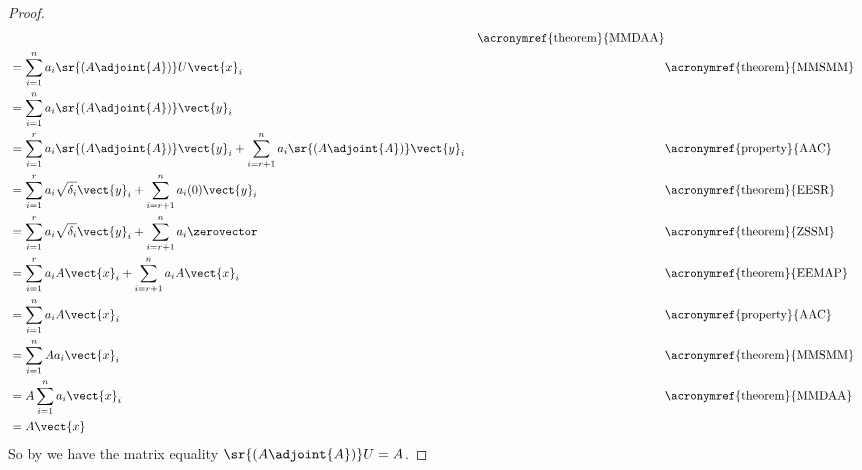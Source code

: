 \begin{proof}
\begin{align*}
&&\text{\acronymref{theorem}{MMDAA}}\\
%
&=\sum_{i=1}^{n}a_i\sr{\left(A\adjoint{A}\right)}U\vect{x}_i
&&\text{\acronymref{theorem}{MMSMM}}\\
%
&=\sum_{i=1}^{n}a_i\sr{\left(A\adjoint{A}\right)}\vect{y}_i\\
%
&=\sum_{i=1}^{r}a_i\sr{\left(A\adjoint{A}\right)}\vect{y}_i
+\sum_{i=r+1}^{n}a_i\sr{\left(A\adjoint{A}\right)}\vect{y}_i
&&\text{\acronymref{property}{AAC}}\\
%
&=\sum_{i=1}^{r}a_i\sqrt{\delta_i}\vect{y}_i
+\sum_{i=r+1}^{n}a_i(0)\vect{y}_i
&&\text{\acronymref{theorem}{EESR}}\\
%
&=\sum_{i=1}^{r}a_i\sqrt{\delta_i}\vect{y}_i
+\sum_{i=r+1}^{n}a_i\zerovector
&&\text{\acronymref{theorem}{ZSSM}}\\
%
&=\sum_{i=1}^{r}a_iA\vect{x}_i
+\sum_{i=r+1}^{n}a_iA\vect{x}_i
&&\text{\acronymref{theorem}{EEMAP}}\\
%
&=\sum_{i=1}^{n}a_iA\vect{x}_i
&&\text{\acronymref{property}{AAC}}\\
%
&=\sum_{i=1}^{n}Aa_i\vect{x}_i
&&\text{\acronymref{theorem}{MMSMM}}\\
%
&=A\sum_{i=1}^{n}a_i\vect{x}_i
&&\text{\acronymref{theorem}{MMDAA}}\\
%
&=A\vect{x}
%
\end{align*}
%
So by  we have the matrix equality $\sr{\left(A\adjoint{A}\right)}U=A$.
%
\end{proof}
%
